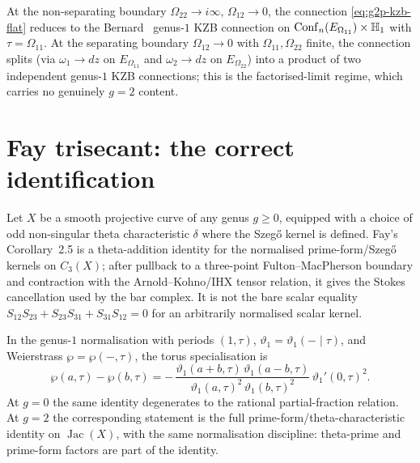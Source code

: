 \begin{remark}
\label{rem:g2p-g1-limit}
At the non-separating boundary $\Omega_{22}\to i\infty$,
$\Omega_{12}\to 0$, the connection
\eqref{eq:g2p-kzb-flat} reduces to the
Bernard~\cite{Bernard88} genus-$1$ KZB connection on
$\mathrm{Conf}_n(E_{\Omega_{11}})\times\mathbb{H}_1$ with $\tau=\Omega_{11}$.
At the separating boundary $\Omega_{12}\to 0$ with
$\Omega_{11},\Omega_{22}$ finite, the connection splits
(via $\omega_1\to dz$ on $E_{\Omega_{11}}$ and
$\omega_2\to dz$ on $E_{\Omega_{22}}$) into a product of two
independent genus-$1$ KZB connections; this is the
factorised-limit regime, which carries no genuinely $g=2$
content.
\end{remark}

\section{Fay trisecant: the correct identification}
\label{sec:g2-fay}

\begin{theorem}
\label{thm:fay-trisecant-genus-2-specific}
Let $X$ be a smooth projective curve of any genus $g\ge 0$,
equipped with a choice of odd non-singular theta
characteristic $\delta$ where the Szeg\H{o} kernel is defined.
Fay's Corollary~2.5 is a theta-addition identity for the
normalised prime-form/Szeg\H{o} kernels on $C_3(X)$; after
pullback to a three-point Fulton--MacPherson boundary and
contraction with the Arnold--Kohno/IHX tensor relation, it gives
the Stokes cancellation used by the bar complex. It is not the
bare scalar equality
$S_{12}S_{23}+S_{23}S_{31}+S_{31}S_{12}=0$ for an arbitrarily
normalised scalar kernel.

In the genus-$1$ normalisation with periods $(1,\tau)$,
$\vartheta_1=\vartheta_1(-\mid\tau)$, and Weierstrass
$\wp=\wp(-,\tau)$, the torus specialisation is
\begin{equation}\label{eq:fay-three-term}
 \wp(a,\tau)-\wp(b,\tau)
 =
 -\,\frac{
 \vartheta_1(a+b,\tau)\,\vartheta_1(a-b,\tau)}
 {\vartheta_1(a,\tau)^2\,\vartheta_1(b,\tau)^2}
 \,\vartheta_1'(0,\tau)^2 .
\end{equation}
At $g=0$ the same identity degenerates to the rational
partial-fraction relation. At $g=2$ the corresponding statement is
the full prime-form/theta-characteristic identity on
$\operatorname{Jac}(X)$, with the same normalisation discipline:
theta-prime and prime-form factors are part of the identity.
\end{theorem}

